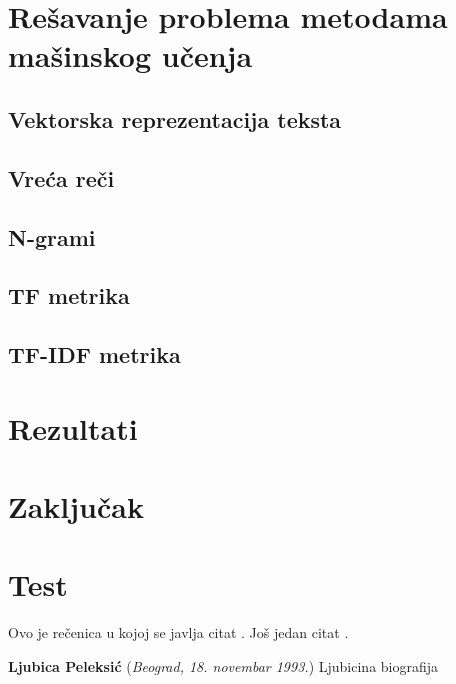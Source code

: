 \documentclass[12pt,oneside]{memoir}
\begin{document}
\chapter{Rešavanje problema metodama mašinskog učenja}

\section{Vektorska reprezentacija teksta}
\section{Vreća reči}
\section{N-grami}
\section{TF metrika}
\section{TF-IDF metrika}

\chapter{Rezultati}



\chapter{Zaključak}

\chapter{Test}

Ovo je rečenica u kojoj se javlja citat \cite{PetrovicMikic2015}.
Još jedan citat \cite{GuSh:243}.





% 
\literatura

\backmatter


\begin{biografija}
  \textbf{Ljubica Peleksić} (\emph{Beograd,
    18.  novembar 1993.}) 
	Ljubicina biografija
\end{biografija}
\end{document}
